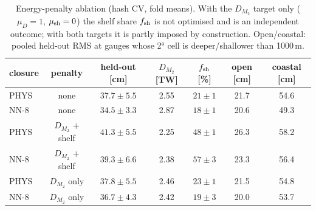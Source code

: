 \begin{table}[t]\centering\footnotesize
\caption{Energy-penalty ablation (hash CV, fold means). With the $D_{M_2}$ target only ($\mu_D=1$, $\mu_{\rm sh}=0$) the shelf share $f_{\rm sh}$ is not optimised and is an independent outcome; with both targets it is partly imposed by construction. Open/coastal: pooled held-out RMS at gauges whose 2° cell is deeper/shallower than 1000\,m.}
\label{tab:ablation}
\begin{tabular}{lcccccc}
\toprule
closure & penalty & held-out [cm] & $D_{M_2}$ [TW] & $f_{\rm sh}$ [\%] & open [cm] & coastal [cm] \\
\midrule
\textsc{PHYS} & none & $37.7\pm5.5$ & 2.55 & $21\pm1$ & 21.7 & 54.6 \\
\textsc{NN-8} & none & $34.5\pm3.3$ & 2.87 & $18\pm1$ & 20.6 & 49.3 \\
\textsc{PHYS} & $D_{M_2}$ + shelf & $41.3\pm5.5$ & 2.25 & $48\pm1$ & 26.3 & 58.2 \\
\textsc{NN-8} & $D_{M_2}$ + shelf & $39.3\pm6.6$ & 2.38 & $57\pm3$ & 23.3 & 56.4 \\
\textsc{PHYS} & $D_{M_2}$ only & $37.8\pm5.5$ & 2.46 & $23\pm1$ & 21.5 & 54.8 \\
\textsc{NN-8} & $D_{M_2}$ only & $36.7\pm4.3$ & 2.42 & $19\pm3$ & 20.0 & 53.7 \\
\bottomrule
\end{tabular}
\end{table}
